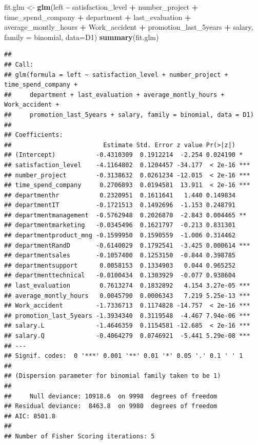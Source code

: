 \documentclass[
  11pt,
]{article}
\newenvironment{Shaded}{\begin{snugshade}}{\end{snugshade}}
\newcommand{\AttributeTok}[1]{\textcolor[rgb]{0.13,0.29,0.53}{#1}}
\newcommand{\FunctionTok}[1]{\textcolor[rgb]{0.13,0.29,0.53}{\textbf{#1}}}
\newcommand{\NormalTok}[1]{#1}
\newcommand{\OtherTok}[1]{\textcolor[rgb]{0.56,0.35,0.01}{#1}}
\newcommand{\SpecialCharTok}[1]{\textcolor[rgb]{0.81,0.36,0.00}{\textbf{#1}}}
\begin{document}
\begin{Shaded}
\begin{Highlighting}[]
\NormalTok{fit.glm }\OtherTok{\textless{}{-}} \FunctionTok{glm}\NormalTok{(left }\SpecialCharTok{\textasciitilde{}}\NormalTok{ satisfaction\_level }\SpecialCharTok{+}\NormalTok{ number\_project   }\SpecialCharTok{+}\NormalTok{ time\_spend\_company }\SpecialCharTok{+} 
\NormalTok{department }\SpecialCharTok{+}\NormalTok{ last\_evaluation }\SpecialCharTok{+}\NormalTok{  average\_montly\_hours }\SpecialCharTok{+}\NormalTok{ Work\_accident }\SpecialCharTok{+}\NormalTok{ promotion\_last\_5years }\SpecialCharTok{+}\NormalTok{ salary, }
\AttributeTok{family =}\NormalTok{ binomial, }\AttributeTok{data=}\NormalTok{D1)}
\FunctionTok{summary}\NormalTok{(fit.glm)}
\end{Highlighting}
\end{Shaded}

\begin{verbatim}
## 
## Call:
## glm(formula = left ~ satisfaction_level + number_project + time_spend_company + 
##     department + last_evaluation + average_montly_hours + Work_accident + 
##     promotion_last_5years + salary, family = binomial, data = D1)
## 
## Coefficients:
##                         Estimate Std. Error z value Pr(>|z|)    
## (Intercept)           -0.4310309  0.1912214  -2.254 0.024190 *  
## satisfaction_level    -4.1164802  0.1204457 -34.177  < 2e-16 ***
## number_project        -0.3138632  0.0261234 -12.015  < 2e-16 ***
## time_spend_company     0.2706893  0.0194581  13.911  < 2e-16 ***
## departmenthr           0.2320951  0.1611641   1.440 0.149834    
## departmentIT          -0.1721513  0.1492696  -1.153 0.248791    
## departmentmanagement  -0.5762948  0.2026870  -2.843 0.004465 ** 
## departmentmarketing   -0.0345496  0.1621797  -0.213 0.831301    
## departmentproduct_mng -0.1599950  0.1590559  -1.006 0.314462    
## departmentRandD       -0.6140029  0.1792541  -3.425 0.000614 ***
## departmentsales       -0.1057400  0.1253150  -0.844 0.398785    
## departmentsupport      0.0058153  0.1334903   0.044 0.965252    
## departmenttechnical   -0.0100434  0.1303929  -0.077 0.938604    
## last_evaluation        0.7613274  0.1832892   4.154 3.27e-05 ***
## average_montly_hours   0.0045790  0.0006343   7.219 5.25e-13 ***
## Work_accident         -1.7336713  0.1174828 -14.757  < 2e-16 ***
## promotion_last_5years -1.3934340  0.3119548  -4.467 7.94e-06 ***
## salary.L              -1.4646359  0.1154581 -12.685  < 2e-16 ***
## salary.Q              -0.4064279  0.0746921  -5.441 5.29e-08 ***
## ---
## Signif. codes:  0 '***' 0.001 '**' 0.01 '*' 0.05 '.' 0.1 ' ' 1
## 
## (Dispersion parameter for binomial family taken to be 1)
## 
##     Null deviance: 10918.6  on 9998  degrees of freedom
## Residual deviance:  8463.8  on 9980  degrees of freedom
## AIC: 8501.8
## 
## Number of Fisher Scoring iterations: 5
\end{verbatim}
\end{document}
